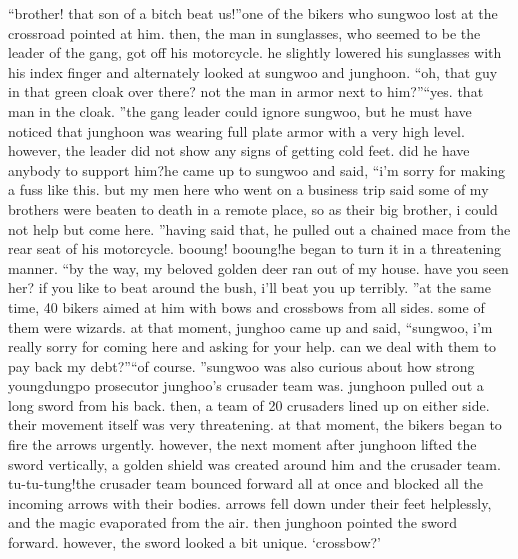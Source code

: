 “brother! that son of a bitch beat us!”one of the bikers who sungwoo lost at the crossroad pointed at him.
 then, the man in sunglasses, who seemed to be the leader of the gang, got off his motorcycle.
he slightly lowered his sunglasses with his index finger and alternately looked at sungwoo and junghoon.
“oh, that guy in that green cloak over there? not the man in armor next to him?”“yes.
 that man in the cloak.
”the gang leader could ignore sungwoo, but he must have noticed that junghoon was wearing full plate armor with a very high level.
 however, the leader did not show any signs of getting cold feet.
 did he have anybody to support him?he came up to sungwoo and said, “i’m sorry for making a fuss like this.
 but my men here who went on a business trip said some of my brothers were beaten to death in a remote place, so as their big brother, i could not help but come here.
”having said that, he pulled out a chained mace from the rear seat of his motorcycle.
booung! booung!he began to turn it in a threatening manner.
“by the way, my beloved golden deer ran out of my house.
 have you seen her? if you like to beat around the bush, i’ll beat you up terribly.
”at the same time, 40 bikers aimed at him with bows and crossbows from all sides.
 some of them were wizards.
at that moment, junghoo came up and said, “sungwoo, i’m really sorry for coming here and asking for your help.
 can we deal with them to pay back my debt?”“of course.
”sungwoo was also curious about how strong youngdungpo prosecutor junghoo’s crusader team was.
junghoon pulled out a long sword from his back.
 then, a team of 20 crusaders lined up on either side.
 their movement itself was very threatening.
at that moment, the bikers began to fire the arrows urgently.
 however, the next moment after junghoon lifted the sword vertically, a golden shield was created around him and the crusader team.
tu-tu-tung!the crusader team bounced forward all at once and blocked all the incoming arrows with their bodies.
 arrows fell down under their feet helplessly, and the magic evaporated from the air.
then junghoon pointed the sword forward.
 however, the sword looked a bit unique.
‘crossbow?’

 